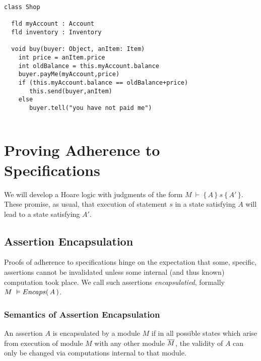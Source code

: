 \newcommand{\extract}[1]{\ensuremath{{\mathcal I}\!nvs(#1)}}

\begin{lstlisting}
class Shop

  fld myAccount : Account
  fld inventory : Inventory
    
  void buy(buyer: Object, anItem: Item)
    int price = anItem.price
    int oldBalance = this.myAccount.balance
    buyer.payMe(myAccount,price)
    if (this.myAccount.balance == oldBalance+price)
       this.send(buyer,anItem)
    else
       buyer.tell("you have not paid me")  
             
\end{lstlisting}


\section{Proving Adherence to \SpecLang Specifications}


We will develop a  Hoare logic with judgments of the form  $M\ \vdash\  \{\, A \,  \}\ s\  \{\, A' \, \}$. These promise, as usual, that execution of statement $s$ in a state satisfying $A$ will lead to a state satisfying $A'$. 





\subsection {Assertion Encapsulation}
\label{s:encaps-proof}

{
Proofs of adherence to {\SpecLang specifications  hinge on the expectation that some, 
specific, assertions cannot be invalidated unless some 
} internal (and thus known) computation took place. 
{We call such assertions   \emph{encapsulatied},}
}
formally $M\ \vDash  {\ensuremath Encaps(\, A\, )}$.


\subsubsection{Semantics of Assertion Encapsulation}

{An assertion $A$  is  encapsulated by a module $M$%
if in all possible states which arise from execution of module $M$ with any other  module $\overline{M}$,%
the validity of $A$}  {can only be changed via computations internal to that module}.


